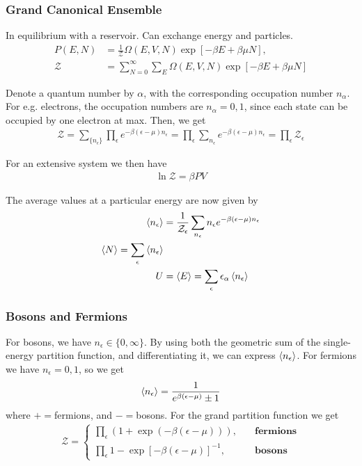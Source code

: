 \documentclass[a4paper, english, 12pt]{article}
\newcommand{\eps}{\epsilon}
\begin{document}
\begin{multicols*}{2}
\subsubsection*{\scriptsize Grand Canonical Ensemble}
In equilibrium with a reservoir. Can exchange energy and particles. 
\begin{align*}
    P(E,N) &= \frac{1}{\mathcal{Z}}\Omega(E,V,N) \exp[-\beta E + \beta \mu N], \\
    \mathcal{Z} &= \sum_{N=0}^\infty \sum_E \Omega(E,V,N)\exp[-\beta E + \beta \mu N]
\end{align*}

Denote a quantum number by $\alpha$, with the corresponding occupation number $n_\alpha$. For e.g. electrons, the occupation numbers are $n_\alpha=0,1$, since each state can be occupied by one electron at max. Then, we get 
\begin{align*}
    \mathcal{Z} = \sum_{\{n_\epsilon\}} \prod_\epsilon e^{-\beta(\epsilon-\mu)n_\epsilon} = \prod_\epsilon \sum_{n_\epsilon} e^{-\beta(\epsilon-\mu)n_\epsilon} = \prod_\epsilon \mathcal{Z}_\epsilon
\end{align*} 


For an extensive system we then have 
\begin{align*}
    \ln\mathcal{Z} = \beta PV 
\end{align*}

The average values at a particular energy are now given by 
\begin{align*}
    \expval{n_\epsilon} &= \frac{1}{\mathcal{Z}_\epsilon} \sum_{n_\epsilon} n_\epsilon e^{-\beta(\epsilon-\mu)n_\epsilon} \\ 
    \expval{N} = \sum_\epsilon \expval{n_\epsilon} \\ 
    U &= \expval{E} = \sum_\eps \eps_\alpha \expval{n_\eps}
\end{align*}

\subsubsection*{\scriptsize Bosons and Fermions}
For bosons, we have $n_\eps\in\{0,\infty\}$. By using both the geometric sum of the single-energy partition function, and differentiating it, we can express $\expval{n_\eps}$. For fermions we have $n_\eps=0,1$, so we get 
\begin{align*}
    \expval{n_\eps} = \frac{1}{e^{\beta(\eps-\mu)} \pm 1}
\end{align*}
where $+=$fermions, and $-=$bosons. For the grand partition function we get 
\begin{align*}
    \mathcal{Z} = \begin{cases}
        \prod_\eps (1+\exp(-\beta(\eps-\mu))),\quad&\textbf{fermions} \\ 
        \prod_\eps {1-\exp[-\beta(\eps-\mu)]}^{-1},\quad&\textbf{bosons}
    \end{cases}
\end{align*}


\end{multicols*}
\end{document}
